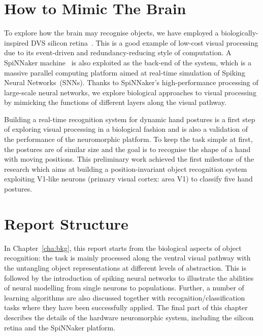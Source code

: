\section{How to Mimic The Brain}
\label{sec:brn}
To explore how the brain may recognise objects, we have employed a biologically-inspired DVS silicon retina~\cite{lenero20113}.
This is a good example of low-cost visual processing due to  its event-driven and redundancy-reducing style of computation.
A SpiNNaker machine~\cite{furber2014spinnaker} is also exploited as the back-end of the system, which is a massive parallel computing platform aimed at real-time simulation of Spiking Neural Networks~(SNNs). 
Thanks to SpiNNaker's high-performance processing of large-scale neural networks, we explore biological approaches to visual processing by mimicking the functions of different layers along the visual pathway. 

Building a real-time recognition system for dynamic hand postures is a first step of exploring visual processing in a biological fashion and is also a validation of the performance of the neuromorphic platform.
To keep the task simple at first, the postures are of similar size and the goal is to recognise the shape of a hand with moving positions.
This preliminary work achieved the first milestone of the research which aims at building a position-invariant object recognition system exploiting V1-like neurons (primary visual cortex: area V1) to classify five hand postures. 
\section{Report Structure}
\label{sec:str}
In Chapter~\ref{cha:bkg}, this report starts from the biological aspects of object recognition: the task is mainly processed along the ventral visual pathway with the untangling object representations at different levels of abstraction.
This is followed by the introduction of spiking neural networks to illustrate the abilities of neural modelling from single neurons to populations.
Further, a number of learning algorithms are also discussed together with recognition/classification tasks where they have been successfully applied.
The final part of this chapter describes the details of the hardware neuromorphic system, including the silicon retina and the SpiNNaker platform.

